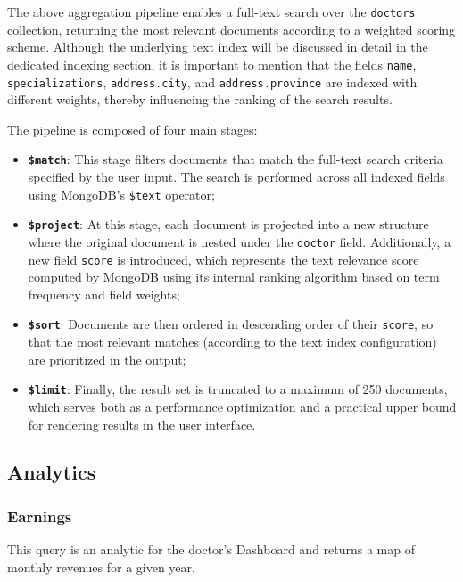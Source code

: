 The above aggregation pipeline enables a full-text search over the \texttt{doctors} collection, returning the most relevant documents according to a weighted scoring scheme. Although the underlying text index will be discussed in detail in the dedicated indexing section, it is important to mention that the fields \texttt{name}, \texttt{specializations}, \texttt{address.city}, and \texttt{address.province} are indexed with different weights, thereby influencing the ranking of the search results.

The pipeline is composed of four main stages:
\begin{itemize}
	\item \textbf{\texttt{\$match}}: This stage filters documents that match the full-text search criteria specified by the user input. The search is performed across all indexed fields using MongoDB's \texttt{\$text} operator;
	
	\item \textbf{\texttt{\$project}}: At this stage, each document is projected into a new structure where the original document is nested under the \texttt{doctor} field. Additionally, a new field \texttt{score} is introduced, which represents the text relevance score computed by MongoDB using its internal ranking algorithm based on term frequency and field weights;
	
	\item \textbf{\texttt{\$sort}}: Documents are then ordered in descending order of their \texttt{score}, so that the most relevant matches (according to the text index configuration) are prioritized in the output;
	
	\item \textbf{\texttt{\$limit}}: Finally, the result set is truncated to a maximum of 250 documents, which serves both as a performance optimization and a practical upper bound for rendering results in the user interface.
\end{itemize}

\subsection{Analytics}
\subsubsection{Earnings}
This query is an analytic for the doctor's Dashboard and returns a map of monthly revenues for a given year.

